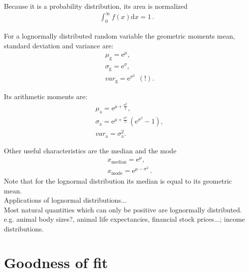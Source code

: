 Because it is a probability distribution, its area is normalized
\begin{align}
	\int_0^\infty f(x) \text{d} x = 1\,.
\end{align}

For a lognormally distributed random variable the geometric moments mean, standard deviation and variance are:
\begin{align*}
	&\mu_\text{g} = \text{e}^\mu ,\\
	&\sigma_\text{g} = \text{e}^\sigma ,\\
	&var_\text{g} = \text{e}^{\sigma^2}~~(!) .
\end{align*}

Its arithmetic moments are:
\begin{align*}
	&\mu_\text{a} = \text{e}^{\mu + \frac{\sigma^2}{2}} ,\\
	&\sigma_\text{a} = \text{e}^{\mu + \frac{\sigma^2}{2}} \, \left(\text{e}^{\sigma^2} - 1\right) ,\\
	&var_\text{a} = \sigma_\text{a}^2 .
\end{align*}

Other useful characteristics are the median and the mode
\begin{align*}
	&x_\text{median} = \text{e}^{\mu},\\
	&x_\text{mode} = \text{e}^{\mu - \sigma^2}\,.
\end{align*}
Note that for the lognormal distribution its median is equal to its geometric mean.\\

Applications of lognormal distributions...\\

Most natural quantities which can only be positive are lognormally distributed. e.g. animal body sizes?, animal life expectancies, financial stock prices...; income distributions.\\



\section{Goodness of fit}
\label{sec:goodness_of_fit}

